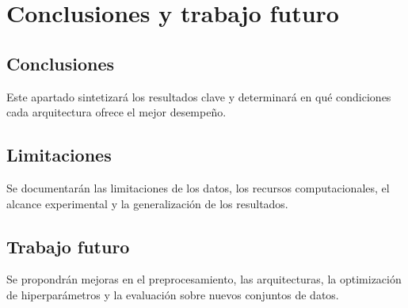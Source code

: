 \chapter{Conclusiones y trabajo futuro}

\section{Conclusiones}

Este apartado sintetizará los resultados clave y determinará en qué condiciones cada arquitectura ofrece el mejor desempeño.

\section{Limitaciones}

Se documentarán las limitaciones de los datos, los recursos computacionales, el alcance experimental y la generalización de los resultados.

\section{Trabajo futuro}

Se propondrán mejoras en el preprocesamiento, las arquitecturas, la optimización de hiperparámetros y la evaluación sobre nuevos conjuntos de datos.
